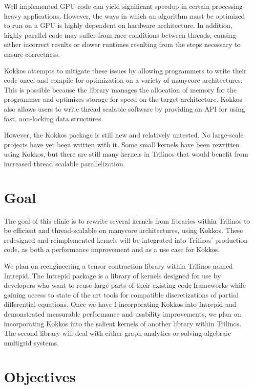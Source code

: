 \documentclass[proposal]{hmcclinic}
\begin{document}
Well implemented GPU code can yield significant speedup in certain
processing-heavy applications.  However, the ways in which an algorithm must be
optimized to run on a GPU is highly dependent on hardware architecture.  In
addition, highly parallel code may suffer from race conditions between threads,
causing either incorrect results or slower runtimes resulting from the steps
necessary to ensure correctness.

Kokkos attempts to mitigate these issues by allowing programmers to write their
code once, and compile for optimization on a variety of manycore architectures.
This is possible because the library manages the allocation of memory for the
programmer and optimizes storage for speed on the target architecture. Kokkos
also allows users to write thread scalable software by providing an API for
using fast, non-locking data structures.

However, the Kokkos package is still new and relatively untested.  No
large-scale projects have yet been written with it.  Some small kernels have
been rewritten using Kokkos, but there are still many kernels in Trilinos that
would benefit from increased thread scalable parallelization.

\section{Goal}

The goal of this clinic is to rewrite several kernels from libraries within
Trilinos to be efficient and thread-scalable on manycore architectures, using
Kokkos.  These redesigned and reimplemented kernels will be integrated into
Trilinos' production code, as both a performance improvement and as a use case
for Kokkos.

We plan on reengineering a tensor contraction library within Trilinos named
Intrepid. The Intrepid package is a library of kernels designed for use by
developers who want to reuse large parts of their existing code frameworks while
gaining access to state of the art tools for compatible discretizations of
partial differential equations. Once we have I incorporating Kokkos into
Intrepid and demonstrated measurable performance and usability improvements, we
plan on incorporating Kokkos into the salient kernels of another library within
Trilinos.  The second library will deal with either graph analytics or solving
algebraic multigrid systems.
\section{Objectives}
\end{document}
